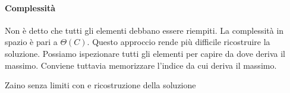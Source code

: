 \paragraph{Complessità}
Non è detto che tutti gli elementi debbano essere riempiti.
La complessità in spazio è pari a \(\Theta(C)\).
Questo approccio rende più difficile ricostruire la soluzione.
Possiamo ispezionare tutti gli elementi per capire da dove deriva il massimo.
Conviene tuttavia memorizzare l'indice da cui deriva il massimo.

\begin{algorithm}[H]
    \caption{Zaino senza limiti con  e ricostruzione della soluzione}
    
\end{algorithm}



